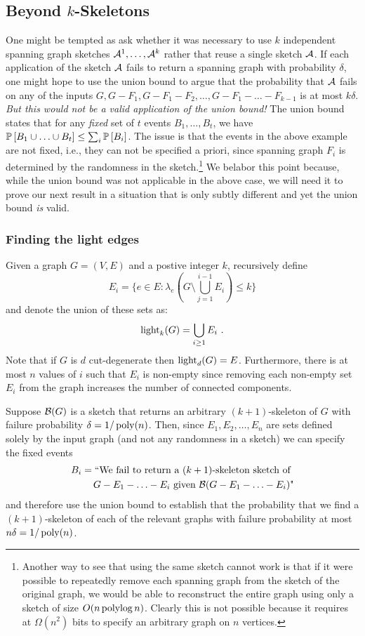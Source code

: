 \subsection{Beyond $k$-Skeletons}
\label{sec:fleshingk}

One might be tempted as ask whether it was necessary to use $k$ independent spanning graph sketches ${\cal A}^1, \ldots, {\cal A}^k$  rather that reuse a single sketch ${\cal A}$. If each application of the sketch ${\cal A}$ fails to return a spanning graph with probability $\delta$, one might hope to use the union bound to argue that the probability that ${\cal A}$ fails on any of the inputs $G, G-F_1, G-F_1-F_2, \ldots, G-F_1-\ldots -F_{k-1}$ is at most $k\delta$. \emph{But this would not be a valid application of the union bound!} The union bound states that for any \emph{fixed} set of $t$  events $B_1, \ldots, B_t$, we  have $\mathbb P \left [ B_1\cup \ldots \cup B_t \right ]\leq \sum_i \mathbb P \left [ B_i \right ]$. The issue is that the events in the above example are not fixed, i.e., they can not be specified a priori, since spanning graph $F_i$ is determined by the randomness in the sketch.\footnote{Another way to see that using the same sketch cannot work is that if it were possible to repeatedly remove each spanning graph from the sketch of the original graph, we would be able to reconstruct the entire graph using only a sketch of size $O(n \operatorname{polylog} n)$. Clearly this is not possible because it requires at $\Omega(n^2)$ bits to specify an arbitrary graph on $n$ vertices.} We belabor this point because, while the union bound was not applicable in the above case,  we will need it to prove our next result in a situation that is only subtly different and yet the union bound \emph{is} valid.

\subsubsection{Finding the light edges}
Given a graph $G=(V,E)$ and a postive integer $k$, recursively define 
\[E_i=\{e\in E: \lambda_e(G\setminus \bigcup_{j=1}^{i-1} E_i) \leq k\}\] and denote the union of these sets as:
\[\operatorname{{light}}_k(G)=\bigcup_{i\geq 1} E_i\ .\]
Note that if $G$ is $d$ cut-degenerate then $\operatorname{{light}}_d(G)=E$. Furthermore, there is at most $n$ values of $i$ such that $E_i$ is non-empty since removing each non-empty set $E_i$ from the graph increases the number of connected components.

Suppose ${\cal B}(G)$ is a sketch that returns an arbitrary $(k+1)$-skeleton of $G$ with failure probability $\delta=1/\operatorname{poly}(n)$. Then, since $E_1, E_2,\ldots, E_n$ are sets defined solely by the input graph (and not any randomness in a sketch) we can specify the fixed events 
\[
\begin{split}
B_i=\mbox{``We fail to return a $(k+1)$-skeleton sketch of } \\
\mbox{$G-E_1-\ldots -E_i$ given ${\cal B}(G-E_1-\ldots -E_i)$"}
\end{split}\]
and therefore use the union bound to establish that the probability that we find a $(k+1)$-skeleton of each of the relevant graphs with failure probability at most $n\delta=1/\operatorname{poly}(n)$.

